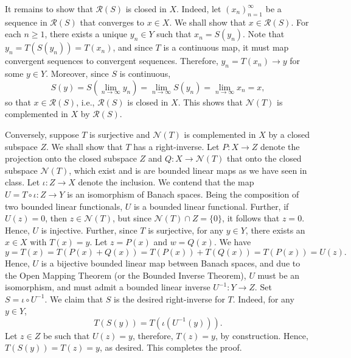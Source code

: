 \documentclass[11pt]{article}
\theoremstyle{thmstyle}
\theoremstyle{defstyle}
\renewcommand{\ge}{\geqslant}
\newcommand{\calN}{\mathcal{N}}
\begin{document}
It remains to show that $\mathcal R(S)$ is closed in $X$. Indeed, let $(x_n)_{n = 1}^\infty$ be a sequence in $\mathcal R(S)$ that converges to $x\in X$. We shall show that $x\in\mathcal R(S)$. For each $n\ge 1$, there exists a unique $y_n\in Y$ such that $x_n = S(y_n)$. Note that $y_n = T(S(y_n)) = T(x_n)$, and since $T$ is a continuous map, it must map convergent sequences to convergent sequences. Therefore, $y_n = T(x_n)\to y$ for some $y\in Y$. Moreover, since $S$ is continuous,
\begin{equation*}
    S(y) = S\left(\lim_{n\to\infty} y_n\right) = \lim_{n\to\infty} S(y_n) = \lim_{n\to\infty} x_n = x,
\end{equation*}
so that $x\in\mathcal R(S)$, i.e., $\mathcal R(S)$ is closed in $X$. This shows that $\calN(T)$ is complemented in $X$ by $\mathcal R(S)$.

Conversely, suppose $T$ is surjective and $\calN(T)$ is complemented in $X$ by a closed subspace $Z$. We shall show that $T$ has a right-inverse. Let $P\colon X\to Z$ denote the projection onto the closed subspace $Z$ and $Q\colon X\to\calN(T)$ that onto the closed subspace $\calN(T)$, which exist and is are bounded linear maps as we have seen in class. Let $\iota\colon Z\to X$ denote the inclusion. We contend that the map $U = T\circ\iota\colon Z\to Y$ is an isomorphism of Banach spaces. Being the composition of two bounded linear functionals, $U$ is a bounded linear functional. Further, if $U(z) = 0$, then $z\in\calN(T)$, but since $\calN(T)\cap Z = \{0\}$, it follows that $z = 0$. Hence, $U$ is injective. Further, since $T$ is surjective, for any $y\in Y$, there exists an $x\in X$ with $T(x) = y$. Let $z = P(x)$ and $w = Q(x)$. We have 
\begin{equation*}
    y = T(x) = T(P(x) + Q(x)) = T(P(x)) + T(Q(x)) = T(P(x)) = U(z).
\end{equation*}
Hence, $U$ is a bijective bounded linear map between Banach spaces, and due to the Open Mapping Theorem (or the Bounded Inverse Theorem), $U$ must be an isomorphism, and must admit a bounded linear inverse $U^{-1}\colon Y\to Z$. Set $S = \iota\circ U^{-1}$. We claim that $S$ is the desired right-inverse for $T$. Indeed, for any $y\in Y$, 
\begin{equation*}
    T(S(y)) = T(\iota(U^{-1}(y))).
\end{equation*}
Let $z\in Z$ be such that $U(z) = y$, therefore, $T(z) = y$, by construction. Hence, $T(S(y)) = T(z) = y$, as desired. This completes the proof.
\end{document}
